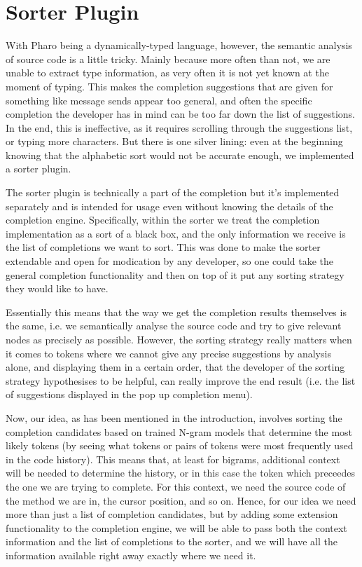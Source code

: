 \section{Sorter Plugin}
With Pharo being a dynamically-typed language, however, the semantic analysis of source code is a little tricky. Mainly because more often than not, we are unable to extract type information, as very often it is not yet known at the moment of typing. This makes the completion suggestions that are given for something like message sends appear too general, and often the specific completion the developer has in mind can be too far down the list of suggestions. In the end, this is ineffective, as it requires scrolling through the suggestions list, or typing more characters. But there is one silver lining: even at the beginning knowing that the alphabetic sort would not be accurate enough, we implemented a sorter plugin.

The sorter plugin is technically a part of the completion but it's implemented separately and is intended for usage even without knowing the details of the completion engine. Specifically, within the sorter we treat the completion implementation as a sort of a black box, and the only information we receive is the list of completions we want to sort. This was done to make the sorter extendable and open for modication by any developer, so one could take the general completion functionality and then on top of it put any sorting strategy they would like to have.

Essentially this means that the way we get the completion results themselves is the same, i.e. we semantically analyse the source code and try to give relevant nodes as precisely as possible. However, the sorting strategy really matters when it comes to tokens where we cannot give any precise suggestions by analysis alone, and displaying them in a certain order, that the developer of the sorting strategy hypothesises to be helpful, can really improve the end result (i.e. the list of suggestions displayed in the pop up completion menu).

Now, our idea, as has been mentioned in the introduction, involves sorting the completion candidates based on trained N-gram models that determine the most likely tokens (by seeing what tokens or pairs of tokens were most frequently used in the code history). This means that, at least for bigrams, additional context will be needed to determine the history, or in this case the token which preceedes the one we are trying to complete. For this context, we need the source code of the method we are in, the cursor position, and so on. Hence, for our idea we need more than just a list of completion candidates, but by adding some extension functionality to the completion engine, we will be able to pass both the context information and the list of completions to the sorter, and we will have all the information available right away exactly where we need it.